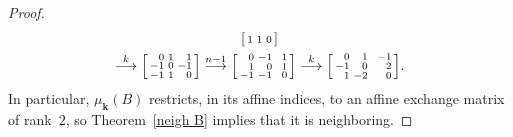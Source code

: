 \documentclass{amsart}
\theoremstyle{definition}
\theoremstyle{remark}
\numberwithin{equation}{section}
\newcommand{\0}{{\mathbf{0}}}
\newcommand{\kk}{{\boldsymbol{k}}}
\begin{document}
\begin{proof}
\begin{multline*}
\begin{bsmallmatrix*}[r]
1&1&0
\end{bsmallmatrix*}\\
\overset{k}{\longrightarrow}
\begin{bsmallmatrix*}[r]
0&1&\,\,\,1\\
-1&0&-1\\
-1&1&0
\end{bsmallmatrix*}
\overset{n-1}{\longrightarrow}
\begin{bsmallmatrix*}[r]
0&-1&\,\,\,1\\
1&0&1\\
-1&-1&0
\end{bsmallmatrix*}
\overset{k}{\longrightarrow}
\begin{bsmallmatrix*}[r]
0&1&\,\,\,-1\\
-1&0&2\\
1&-2&0
\end{bsmallmatrix*}.
\end{multline*}
In particular, $\mu_\kk(B)$ restricts, in its affine indices, to an affine exchange matrix of rank~$2$,
so Theorem~\ref{neigh B} implies that it is neighboring.


\end{proof}
\end{document}
